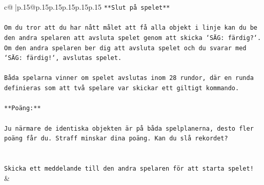 \documentclass{article}
\begin{document}
{\begin{supertabular}{c@{$\;$}|p{.15\linewidth}@{}p{.15\linewidth}p{.15\linewidth}p{.15\linewidth}p{.15\linewidth}p{.15\linewidth}}
{{{\texttt{**Slut på spelet**} \\
\\ 
\texttt{Om du tror att du har nått målet att få alla objekt i linje kan du be den andra spelaren att avsluta spelet genom att skicka `SÄG: färdig?`. Om den andra spelaren ber dig att avsluta spelet och du svarar med `SÄG: färdig!`, avslutas spelet.} \\
\\ 
\texttt{Båda spelarna vinner om spelet avslutas inom 28 rundor, där en runda definieras som att två spelare var skickar ett giltigt kommando.} \\
\\ 
\texttt{**Poäng:**} \\
\\ 
\texttt{Ju närmare de identiska objekten är på båda spelplanerna, desto fler poäng får du. Straff minskar dina poäng. Kan du slå rekordet?} \\
\\ 
\\ 
\texttt{Skicka ett meddelande till den andra spelaren för att starta spelet!} \\
            }
        }
    }
    & \\ \\


\end{supertabular}}
\end{document}

